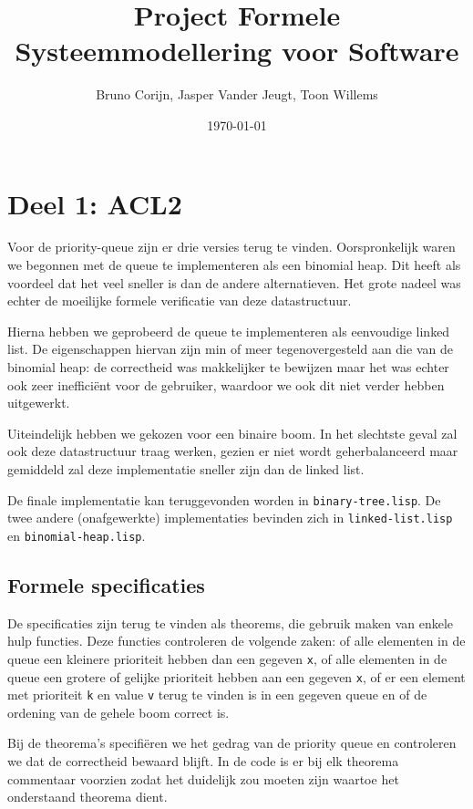 \documentclass[a4paper,10pt]{article}
\title{Project Formele Systeemmodellering voor Software}
\author{Bruno Corijn, Jasper Vander Jeugt, Toon Willems}
\date{\today}
\begin{document}
\maketitle

\section{Deel 1: ACL2}

Voor de priority-queue zijn er drie versies terug te vinden. Oorspronkelijk
waren we begonnen met de queue te implementeren als een binomial heap. Dit heeft
als voordeel dat het veel sneller is dan de andere alternatieven. Het grote
nadeel was echter de moeilijke formele verificatie van deze datastructuur.

Hierna hebben we geprobeerd de queue te implementeren als eenvoudige linked
list. De eigenschappen hiervan zijn min of meer tegenovergesteld aan die van de
binomial heap: de correctheid was makkelijker te bewijzen maar het was echter
ook zeer ineffici\"ent voor de gebruiker, waardoor we ook dit niet verder hebben
uitgewerkt.

Uiteindelijk hebben we gekozen voor een binaire boom. In het slechtste geval zal
ook deze datastructuur traag werken, gezien er niet wordt geherbalanceerd maar
gemiddeld zal deze implementatie sneller zijn dan de linked list.

De finale implementatie kan teruggevonden worden in \texttt{binary-tree.lisp}.
De twee andere (onafgewerkte) implementaties bevinden zich in
\texttt{linked-list.lisp} en \texttt{binomial-heap.lisp}.

\subsection{Formele specificaties}

De specificaties zijn terug te vinden als theorems, die gebruik maken van enkele
hulp functies. Deze functies controleren de volgende zaken: of alle elementen in
de queue een kleinere prioriteit hebben dan een gegeven \texttt{x}, of alle
elementen in de queue een grotere of gelijke prioriteit hebben aan een gegeven
\texttt{x}, of er een element met prioriteit \texttt{k} en value \texttt{v}
terug te vinden is in een gegeven queue en of de ordening van de gehele boom
correct is.

Bij de theorema's specifi\"eren we het gedrag van de priority queue en
controleren we dat de correctheid bewaard blijft. In de code is er bij elk
theorema commentaar voorzien zodat het duidelijk zou moeten zijn waartoe het
onderstaand theorema dient.
\end{document}

